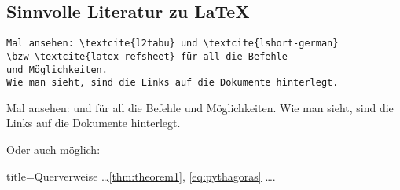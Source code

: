 \subsection{Sinnvolle Literatur zu \LaTeX}
%
\begin{verbatim}
Mal ansehen: \textcite{l2tabu} und \textcite{lshort-german} 
\bzw \textcite{latex-refsheet} für all die Befehle 
und Möglichkeiten.
Wie man sieht, sind die Links auf die Dokumente hinterlegt.	
\end{verbatim}
Mal ansehen: \textcite{l2tabu} und \textcite{lshort-german} \bzw \textcite{latex-refsheet} für all die Befehle und Möglichkeiten.
Wie man sieht, sind die Links auf die Dokumente hinterlegt.

Oder auch möglich: %
\begin{dispExample*}{title=Querverweise}
\ldots \cref{thm:theorem1}, \vref{eq:pythagoras} \ldots.
\end{dispExample*}
